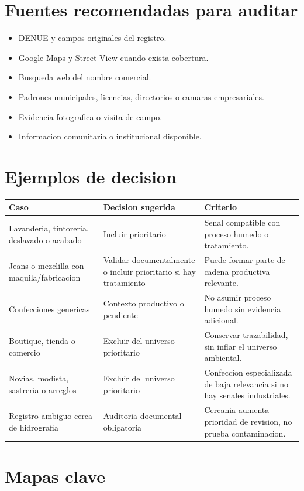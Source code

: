 \documentclass[11pt,letterpaper]{article}
\begin{document}
\section{Fuentes recomendadas para auditar}

\begin{itemize}
  \item DENUE y campos originales del registro.
  \item Google Maps y Street View cuando exista cobertura.
  \item Busqueda web del nombre comercial.
  \item Padrones municipales, licencias, directorios o camaras empresariales.
  \item Evidencia fotografica o visita de campo.
  \item Informacion comunitaria o institucional disponible.
\end{itemize}

\section{Ejemplos de decision}

\begin{longtable}{p{4cm}p{4cm}p{6cm}}
\toprule
Caso & Decision sugerida & Criterio \\
\midrule
Lavanderia, tintoreria, deslavado o acabado & Incluir prioritario & Senal compatible con proceso humedo o tratamiento. \\
Jeans o mezclilla con maquila/fabricacion & Validar documentalmente o incluir prioritario si hay tratamiento & Puede formar parte de cadena productiva relevante. \\
Confecciones genericas & Contexto productivo o pendiente & No asumir proceso humedo sin evidencia adicional. \\
Boutique, tienda o comercio & Excluir del universo prioritario & Conservar trazabilidad, sin inflar el universo ambiental. \\
Novias, modista, sastreria o arreglos & Excluir del universo prioritario & Confeccion especializada de baja relevancia si no hay senales industriales. \\
Registro ambiguo cerca de hidrografia & Auditoria documental obligatoria & Cercania aumenta prioridad de revision, no prueba contaminacion. \\
\bottomrule
\end{longtable}

\section{Mapas clave}
\end{document}
